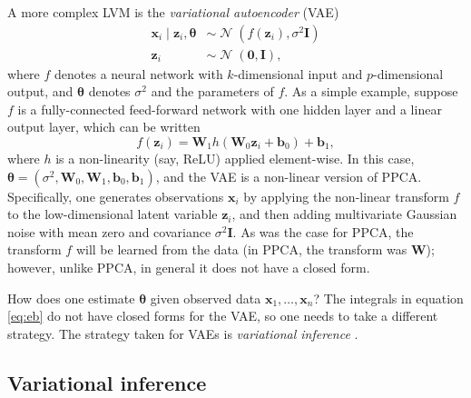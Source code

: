\documentclass[reqno,11pt]{amsart}
\DeclareMathOperator\N{\mathcal{N}}
\newcommand\mi{\mathbf{I}}
\newcommand\mw{\mathbf{W}}
\newcommand\vb{\mathbf{b}}
\newcommand\vtheta{\boldsymbol{\theta}}
\newcommand\vx{\mathbf{x}}
\newcommand\vz{\mathbf{z}}
\begin{document}
A more complex LVM is the \emph{variational autoencoder} (VAE)
\cite{DBLP:journals/corr/KingmaW13}
%
\begin{align}
  \vx_i \mid \vz_i, \vtheta &\sim \N(f(\vz_i), \sigma^2 \mi)\\
  \vz_i &\sim \N(\boldsymbol{0}, \mi),
\end{align}
%
where $f$ denotes a neural network with $k$-dimensional input and
$p$-dimensional output, and $\vtheta$ denotes $\sigma^2$ and the parameters of
$f$. As a simple example, suppose $f$ is a fully-connected feed-forward network
with one hidden layer and a linear output layer, which can be written
%
\begin{equation}
  f(\vz_i) = \mw_1 h(\mw_0 \vz_i + \vb_0) + \vb_1,
\end{equation}
%
where $h$ is a non-linearity (say, ReLU) applied element-wise. In this case,
$\vtheta = (\sigma^2, \mw_0, \mw_1, \vb_0, \vb_1)$, and the VAE is a non-linear
version of PPCA. Specifically, one generates observations $\vx_i$ by applying
the non-linear transform $f$ to the low-dimensional latent variable $\vz_i$,
and then adding multivariate Gaussian noise with mean zero and covariance
$\sigma^2 \mi$. As was the case for PPCA, the transform $f$ will be learned
from the data (in PPCA, the transform was $\mw$); however, unlike PPCA, in
general it does not have a closed form.

How does one estimate $\vtheta$ given observed data $\vx_1, \ldots, \vx_n$? The
integrals in equation \eqref{eq:eb} do not have closed forms for the VAE, so
one needs to take a different strategy. The strategy taken for VAEs is
\emph{variational inference} \cite{10.1080/01621459.2017.1285773}.

\subsection{Variational inference}
\end{document}
